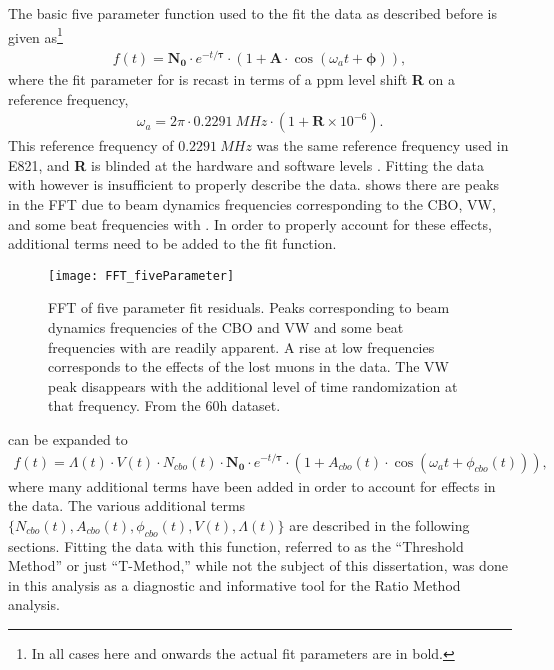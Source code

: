 The basic five parameter function used to the fit the data as described before is given as\footnote{In all cases here and onwards the actual fit parameters are in bold.}
    \begin{align}
        f(t) = \boldsymbol{N_{0}} \cdot e^{-t/\boldsymbol{\tau}} \cdot (1 + \boldsymbol{A} \cdot \cos(\omega_{a}t + \boldsymbol{\phi})),
    \label{eq:fiveparfuncagain}
    \end{align}
where the fit parameter for \wa is recast in terms of a ppm level shift \textbf{R} on a reference frequency,
    \begin{align}
        \omega_{a} = 2 \pi \cdot \SI{0.2291}{MHz} \cdot (1 + \textbf{R} \times 10^{-6}).
    \label{eq:wablind}
    \end{align}
This reference frequency of $\SI{0.2291}{MHz}$ was the same reference frequency used in E821, and \textbf{R} is blinded at the hardware and software levels \cite{ClockManual,SoftwareBlinding}. Fitting the data with  however is insufficient to properly describe the data.  shows there are peaks in the FFT due to beam dynamics frequencies corresponding to the CBO, VW, and some beat frequencies with \wa. In order to properly account for these effects, additional terms need to be added to the fit function. 

    \begin{figure}[]
        \centering
        \texttt{[image: FFT\_fiveParameter]}
        \caption[FFT of five parameter fit residuals]{FFT of five parameter fit residuals. Peaks corresponding to beam dynamics frequencies of the CBO and VW and some beat frequencies with \wa are readily apparent. A rise at low frequencies corresponds to the effects of the lost muons in the data. The VW peak disappears with the additional level of time randomization at that frequency. From the 60h dataset.}
        \label{fig:FFT_fiveParameter}
    \end{figure}

 can be expanded to 
    \begin{align}
        f(t) = \Lambda(t) \cdot V(t) \cdot N_{cbo}(t) \cdot \boldsymbol{N_{0}} \cdot e^{-t/\boldsymbol{\tau}} \cdot (1 + A_{cbo}(t) \cdot \cos(\omega_{a}t + \phi_{cbo}(t))),
    \label{eq:TmethodFunction}
    \end{align}
where many additional terms have been added in order to account for effects in the data. The various additional terms $\{N_{cbo}(t), A_{cbo}(t), \phi_{cbo}(t), V(t), \Lambda(t)\}$ are described in the following sections. Fitting the data with this function, referred to as the ``Threshold Method'' or just ``T-Method,'' while not the subject of this dissertation, was done in this analysis as a diagnostic and informative tool for the Ratio Method analysis. 


